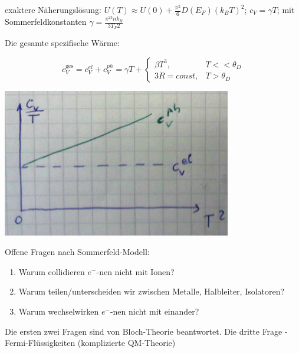 exaktere Näherungslösung:  \(U(T) \approx U(0) +\frac{\pi^2}{6}D(E_F)(k_BT)^2\); \(c_V=\gamma T\); mit Sommerfeldkonstanten \(\gamma = \frac{\pi^23nk_B}{3T_F2}\)

Die gesamte spezifische Wärme:

\[c_V^{\text{ges}} = c_V^{el}+c_V^{ph} = \gamma T + \begin{cases}
 \beta T^3,  & T<<\theta_D\\
 3R=const,  & T>\theta_D
\end{cases}\]


\includegraphics[width=0.75\textwidth]{kap06_30.png}

Offene Fragen nach Sommerfeld-Modell:

\begin{enumerate}
\item Warum collidieren \(e^-\)-nen nicht mit Ionen?
\item Warum teilen/unterscheiden wir zwischen Metalle, Halbleiter, Isolatoren?
\item Warum wechselwirken  \(e^-\)-nen nicht mit einander?
\end{enumerate}

Die ersten zwei Fragen sind von Bloch-Theorie beantwortet. Die dritte Frage - Fermi-Flüssigkeiten (komplizierte QM-Theorie)



